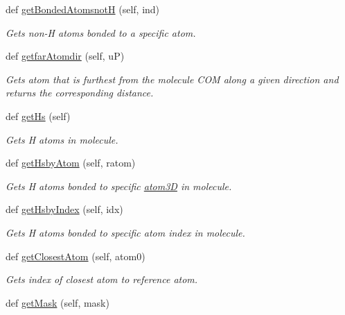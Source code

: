 \begin{DoxyCompactItemize}
def \hyperlink{classmolSimplify_1_1Classes_1_1mol3D_1_1mol3D_acda82e48cde5996f32a55e0acbdf052e}{get\+Bonded\+AtomsnotH} (self, ind)
\begin{DoxyCompactList}\small\item\em Gets non-\/H atoms bonded to a specific atom. \end{DoxyCompactList}\item 
def \hyperlink{classmolSimplify_1_1Classes_1_1mol3D_1_1mol3D_ae4d631214022274b00b853768706d55a}{getfar\+Atomdir} (self, uP)
\begin{DoxyCompactList}\small\item\em Gets atom that is furthest from the molecule C\+OM along a given direction and returns the corresponding distance. \end{DoxyCompactList}\item 
def \hyperlink{classmolSimplify_1_1Classes_1_1mol3D_1_1mol3D_a5b27778bb5e730b3911e0fe9192a4c0e}{get\+Hs} (self)
\begin{DoxyCompactList}\small\item\em Gets H atoms in molecule. \end{DoxyCompactList}\item 
def \hyperlink{classmolSimplify_1_1Classes_1_1mol3D_1_1mol3D_a232adbbe11745aac4561a15fe1850df4}{get\+Hsby\+Atom} (self, ratom)
\begin{DoxyCompactList}\small\item\em Gets H atoms bonded to specific \hyperlink{namespacemolSimplify_1_1Classes_1_1atom3D}{atom3D} in molecule. \end{DoxyCompactList}\item 
def \hyperlink{classmolSimplify_1_1Classes_1_1mol3D_1_1mol3D_a99730d5cf790e512a55fbe0d1fd863c7}{get\+Hsby\+Index} (self, idx)
\begin{DoxyCompactList}\small\item\em Gets H atoms bonded to specific atom index in molecule. \end{DoxyCompactList}\item 
def \hyperlink{classmolSimplify_1_1Classes_1_1mol3D_1_1mol3D_a6f4f405d4a3d80e9810a73a199662800}{get\+Closest\+Atom} (self, atom0)
\begin{DoxyCompactList}\small\item\em Gets index of closest atom to reference atom. \end{DoxyCompactList}\item 
def \hyperlink{classmolSimplify_1_1Classes_1_1mol3D_1_1mol3D_aae3d38b16c8876fd11e6a170b3e18df0}{get\+Mask} (self, mask)

\end{DoxyCompactItemize}
